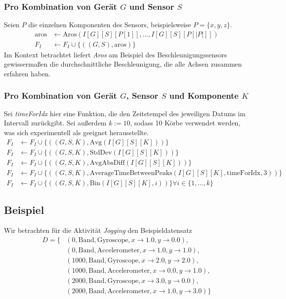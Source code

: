 \subsubsection{Pro Kombination von Gerät $G$ und Sensor $S$}
Seien $P$ die einzelnen Komponenten des Sensors, beispielsweise $P = \{x, y, z\}$.
\begin{align*}
    \text{aros} &\gets \text{Aros}(I[G][S][P[1]], ..., I[G][S][P[|P|]]) \\
    F_I &\gets F_I \cup \{((G, S), \text{aros})\}
\end{align*}
Im Kontext betrachtet liefert \textit{Aros} am Beispiel des Beschleunigungssensors gewissermaßen die durchschnittliche Beschleunigung, die alle Achsen zusammen erfahren haben.
\subsubsection{Pro Kombination von Gerät $G$, Sensor $S$ und Komponente $K$}
Sei \textit{timeForIdx} hier eine Funktion, die den Zeitstempel des jeweiligen Datums im Intervall zurückgibt. Sei außerdem $k := 10$, sodass 10 Körbe verwendet werden, was sich experimentell als geeignet herausstellte.
\begin{align*}
    F_I &\gets F_I \cup \{((G, S, K), \text{Avg}(I[G][S][K]))\} \\
    F_I &\gets F_I \cup \{((G, S, K), \text{StdDev}(I[G][S][K]))\} \\
    F_I &\gets F_I \cup \{((G, S, K), \text{AvgAbsDiff}(I[G][S][K]))\} \\
    F_I &\gets F_I \cup \{((G, S, K), \text{AverageTimeBetweenPeaks}(I[G][S][K], \text{timeForIdx}, 3))\} \\
    F_I &\gets F_I \cup \{((G, S, K), \text{Bin}(I[G][S][K], i))\} \forall i \in \{1, ..., k\}
\end{align*}

\subsection{Beispiel}
Wir betrachten für die Aktivität \textit{Jogging} den Beispieldatensatz
\begin{align*}
D = \{&(0, \text{Band}, \text{Gyroscope}, {x \to 1.0, y \to 0.0}), \\
&(0, \text{Band}, \text{Accelerometer}, {x \to 1.0, y \to 1.0}), \\
&(1000, \text{Band}, \text{Gyroscope}, {x \to 2.0, y \to 2.0}), \\
&(1000, \text{Band}, \text{Accelerometer}, {x \to 0.0, y \to 1.0}), \\
&(2000, \text{Band}, \text{Gyroscope}, {x \to 3.0, y \to 0.0}), \\
&(2000, \text{Band}, \text{Accelerometer}, {x \to 1.0, y \to 3.0})\}
\end{align*} 


